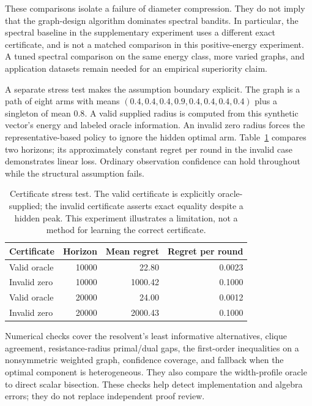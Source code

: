 These comparisons isolate a failure of diameter compression. They do not imply that the graph-design algorithm dominates spectral bandits. In particular, the spectral baseline in the supplementary experiment uses a different exact certificate, and is not a matched comparison in this positive-energy experiment. A tuned spectral comparison on the same energy class, more varied graphs, and application datasets remain needed for an empirical superiority claim.

A separate stress test makes the assumption boundary explicit. The graph is a path of eight arms with means $(0.4,0.4,0.4,0.9,0.4,0.4,0.4,0.4)$ plus a singleton of mean $0.8$. A valid supplied radius is computed from this synthetic vector's energy and labeled oracle information. An invalid zero radius forces the representative-based policy to ignore the hidden optimal arm. Table~\ref{alignment_paper:tab:certificatestress} compares two horizons; its approximately constant regret per round in the invalid case demonstrates linear loss. Ordinary observation confidence can hold throughout while the structural assumption fails.

\begin{table}[t]
\centering\small
\begin{tabular}{lrrr}
\toprule
Certificate & Horizon & Mean regret & Regret per round\\
\midrule

Valid oracle & 10000 & 22.80 & 0.0023 \\
Invalid zero & 10000 & 1000.42 & 0.1000 \\
Valid oracle & 20000 & 24.00 & 0.0012 \\
Invalid zero & 20000 & 2000.43 & 0.1000 \\


\bottomrule
\end{tabular}
\caption{Certificate stress test. The valid certificate is explicitly oracle-supplied; the invalid certificate asserts exact equality despite a hidden peak. This experiment illustrates a limitation, not a method for learning the correct certificate.}
\label{alignment_paper:tab:certificatestress}
\end{table}

Numerical checks cover the resolvent's least informative alternatives, clique agreement, resistance-radius primal/dual gaps, the first-order inequalities on a nonsymmetric weighted graph, confidence coverage, and fallback when the optimal component is heterogeneous. They also compare the width-profile oracle to direct scalar bisection. These checks help detect implementation and algebra errors; they do not replace independent proof review.



